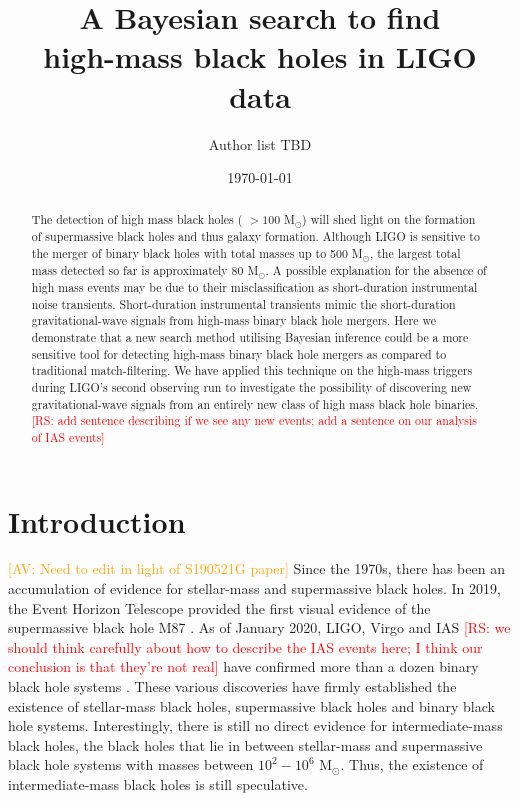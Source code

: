 \documentclass[%
preprint,
 amsmath,amssymb,
 aps,
]{revtex4}
\newcommand{\msun}{{\sc M${}_\odot$}\xspace}
\newcommand{\av}[1]{\textcolor{orange}{[AV: #1]}}
\newcommand{\rs}[1]{\textcolor{red}{[RS: #1]}}
\begin{document}

\title{A Bayesian search to find \\high-mass black holes in LIGO data}%


\author{Author list TBD}

\date{\today}

\begin{abstract}

The detection of high mass black holes ( $>100$ \msun) will shed light on the formation of supermassive black holes and thus galaxy formation. Although LIGO is sensitive to the merger of binary black holes with total masses up to 500 \msun, the largest total mass detected so far is approximately $80$ \msun. A possible explanation for the absence of high mass events may be due to their misclassification as short-duration instrumental noise transients. Short-duration instrumental transients mimic the short-duration gravitational-wave signals from high-mass binary black hole mergers. Here we demonstrate that a new search method utilising Bayesian inference could be a more sensitive tool for detecting high-mass binary black hole mergers as compared to traditional match-filtering. We have applied this technique on the high-mass triggers during LIGO's second observing run to investigate the possibility of discovering new gravitational-wave signals from an entirely new class of high mass black hole binaries. \rs{add sentence describing if we see any new events; add a sentence on our analysis of IAS events}



\end{abstract}

\maketitle



\section{\label{sec:Introduction}Introduction}
\av{Need to edit in light of S190521G paper}
Since the 1970s, there has been an accumulation of evidence for stellar-mass and supermassive black holes. In 2019, the Event Horizon Telescope provided the first visual evidence of the supermassive black hole M87  \cite{m87photo}.  As of January 2020, LIGO, Virgo and IAS \rs{we should think carefully about how to describe the IAS events here; I think our conclusion is that they're not real} have confirmed more than a dozen binary black hole systems \cite{GWTC1, IAS0, IAS1, IAS2, pycbc_ogc_2}. These various discoveries have firmly established the existence of stellar-mass black holes, supermassive black holes and binary black hole systems.  Interestingly, there is still no direct evidence for intermediate-mass black holes, the black holes that lie in between stellar-mass and supermassive black hole systems with masses between $10^2-10^6$ \msun. Thus, the existence of intermediate-mass black holes is still speculative. \\
\end{document}
